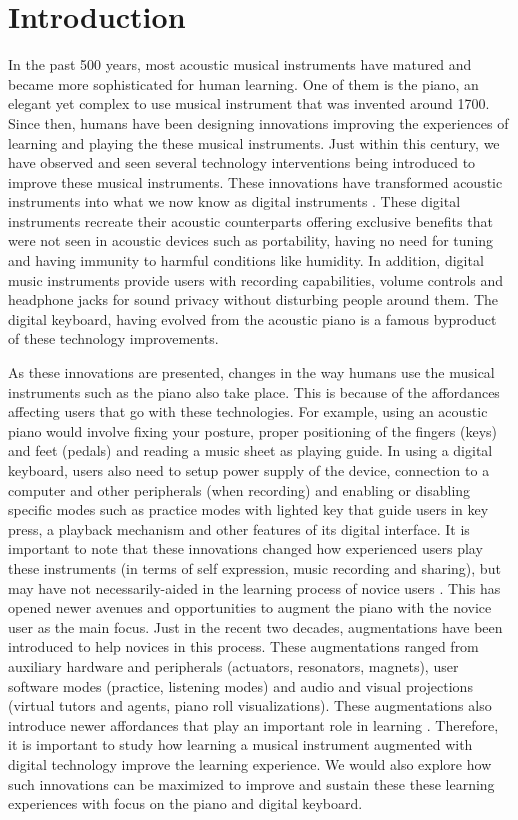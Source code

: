 \documentclass[sigchi, review]{acmart}
\begin{document}
\section{Introduction}
In the past 500 years, most acoustic musical instruments have matured and became more sophisticated for human learning. One of them is the piano, an elegant yet complex to use musical instrument that was invented around 1700. Since then, humans have been designing innovations improving the experiences of learning and playing the these musical instruments. Just within this century, we have observed and seen several technology interventions being introduced to improve these musical instruments. These innovations have transformed acoustic instruments into what we now know as digital instruments \cite{magnusson2007acoustic}. These digital instruments recreate their acoustic counterparts offering exclusive benefits that were not seen in acoustic devices such as portability, having no need for tuning and having immunity to harmful conditions like humidity. In addition, digital music instruments provide users with recording capabilities, volume controls and headphone jacks for sound privacy without disturbing people around them. The digital keyboard, having evolved from the acoustic piano is a famous byproduct of these technology improvements. 

As these innovations are presented, changes in the way humans use the musical instruments such as the piano also take place. This is because of the affordances affecting users that go with these technologies. For example, using an acoustic piano would involve fixing your posture, proper positioning of the fingers (keys) and feet (pedals) and reading a music sheet as playing guide. In using a digital keyboard, users also need to setup power supply of the device, connection to a computer and other peripherals (when recording) and enabling or disabling specific modes such as practice modes with lighted key that guide users in key press, a playback mechanism and other features of its digital interface. It is important to note that these innovations changed how experienced users play these instruments (in terms of self expression, music recording and sharing), but may have not necessarily-aided in the learning process of novice users \cite{bown2009understanding}. This has opened newer avenues and opportunities to augment the piano with the novice user as the main focus. Just in the recent two decades, augmentations have been introduced to help novices in this process. These augmentations ranged from auxiliary hardware and peripherals (actuators, resonators, magnets), user software modes (practice, listening modes) and audio and visual projections (virtual tutors and agents, piano roll visualizations). These augmentations also introduce newer affordances that play an important role in learning \citet{dede1996evolution}. Therefore, it is important to study how learning a musical instrument augmented with digital technology improve the learning experience. We would also explore how such innovations can be maximized to improve and sustain these these learning experiences with focus on the piano and digital keyboard. 
\end{document}
